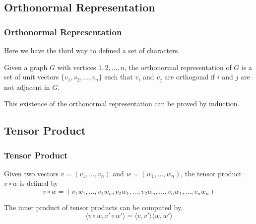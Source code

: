 \subsection{Orthonormal Representation}

      \begin{frame}
            \frametitle{Orthonormal Representation}

            Here we have the third way to defined a set of characters.

            \begin{definition}\label{def:orthonormalRepresentation}
                  Given a graph $ G $ with vertices $ 1,2,\dots,n $, the orthonormal representation of $ G $ is a set of unit vectors $ \{v_1, v_2, \dots, v_n\} $ such that $ v_i $ and $ v_j $ are orthogonal if $ i $ and $ j $ are not adjacent in $ G $.
            \end{definition}

            \pause

            This existence of the orthonormal representation can be proved by induction.

      \end{frame}

\subsection{Tensor Product}

      \begin{frame}
            \frametitle{Tensor Product}
            \begin{definition}\label{def:tensorProduct}
                  Given two vectors $ v = \left(v_{1},\dots,v_{n}\right) $ and $ w = \left(w_{1},\dots,w_{n}\right) $, the tensor product $ v \circ w $ is defined by
                  \begin{equation}
                        v \circ w = \left(
                              v_{1}w_{1},\dots,v_{1}w_{n},
                              v_{2}w_{1},\dots,v_{2}w_{n},
                              \dots,
                              v_{n}w_{1},\dots,v_{n}w_{n}
                              \right)
                  \end{equation}
            \end{definition}

            \pause

            \begin{lemma}
                  The inner product of tensor products can be computed by,
                  \begin{equation}
                        \langle v \circ w, v' \circ w' \rangle = \langle v, v' \rangle \langle w, w' \rangle
                  \end{equation}
            \end{lemma}

      \end{frame}

